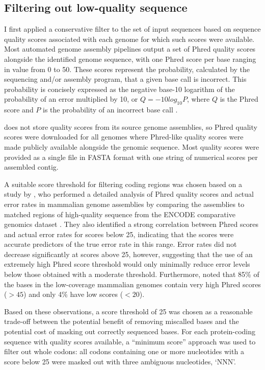 \subsection{Filtering out low-quality sequence}

I first applied a conservative filter to the set of input sequences
based on sequence quality scores associated with each genome for which
such scores were available. Most automated genome assembly pipelines
output a set of Phred quality scores alongside the identified genome
sequence, with one Phred score per base ranging in value from 0 to
50. These scores represent the probability, calculated by the
sequencing and/or assembly program, that a given base call is
incorrect. This probability is concisely expressed as the negative
base-10 logarithm of the probability of an error multiplied by 10, or
$Q=-10log_{10}P$, where $Q$ is the Phred score and $P$ is the
probability of an incorrect base call \citep{Cock2010}.

\ens does not store quality scores from its source genome assemblies,
so Phred quality scores were downloaded for all \lcv genomes where
Phred-like quality scores were made publicly available alongside the
genomic sequence. Most quality scores were provided as a single file
in FASTA format with one string of numerical scores per assembled
contig.

A suitable score threshold for filtering coding regions was chosen
based on a study by \citet{Hubisz2011}, who performed a detailed
analysis of Phred quality scores and actual error rates in \lcv
mammalian genome assemblies by comparing the \lcv assemblies to
matched regions of high-quality sequence from the ENCODE comparative
genomics dataset \citep{Birney2007}. They also identified a strong
correlation between Phred scores and actual error rates for scores
below 25, indicating that the scores were accurate predictors of the
true error rate in this range. Error rates did not decrease
significantly at scores above 25, however, suggesting that the use of
an extremely high Phred score threshold would only minimally reduce
error levels below those obtained with a moderate
threshold. Furthermore, \citet{Hubisz2011} noted that 85\% of the
bases in the low-coverage mammalian genomes contain very high Phred
scores ($>45$) and only 4\% have low scores ($<20$).

Based on these observations, a score threshold of 25 was chosen as a
reasonable trade-off between the potential benefit of removing
miscalled bases and the potential cost of masking out correctly
sequenced bases. For each protein-coding sequence with quality scores
available, a ``minimum score'' approach was used to filter out whole
codons: all codons containing one or more nucleotides with a score
below 25 were masked out with three ambiguous nucleotides, `NNN'.

